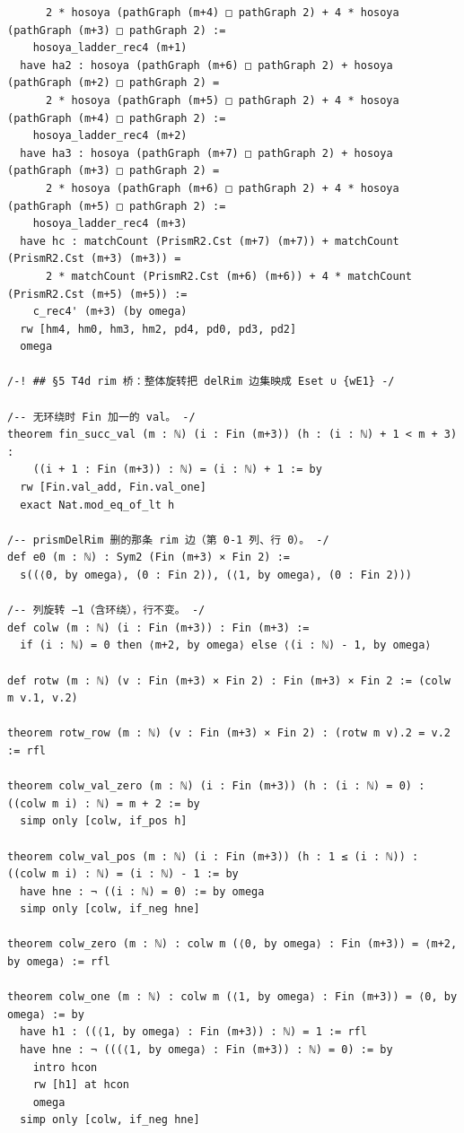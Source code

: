 \documentclass[11pt]{article}
\begin{document}
\begin{lstlisting}
      2 * hosoya (pathGraph (m+4) □ pathGraph 2) + 4 * hosoya (pathGraph (m+3) □ pathGraph 2) :=
    hosoya_ladder_rec4 (m+1)
  have ha2 : hosoya (pathGraph (m+6) □ pathGraph 2) + hosoya (pathGraph (m+2) □ pathGraph 2) =
      2 * hosoya (pathGraph (m+5) □ pathGraph 2) + 4 * hosoya (pathGraph (m+4) □ pathGraph 2) :=
    hosoya_ladder_rec4 (m+2)
  have ha3 : hosoya (pathGraph (m+7) □ pathGraph 2) + hosoya (pathGraph (m+3) □ pathGraph 2) =
      2 * hosoya (pathGraph (m+6) □ pathGraph 2) + 4 * hosoya (pathGraph (m+5) □ pathGraph 2) :=
    hosoya_ladder_rec4 (m+3)
  have hc : matchCount (PrismR2.Cst (m+7) (m+7)) + matchCount (PrismR2.Cst (m+3) (m+3)) =
      2 * matchCount (PrismR2.Cst (m+6) (m+6)) + 4 * matchCount (PrismR2.Cst (m+5) (m+5)) :=
    c_rec4' (m+3) (by omega)
  rw [hm4, hm0, hm3, hm2, pd4, pd0, pd3, pd2]
  omega

/-! ## §5 T4d rim 桥：整体旋转把 delRim 边集映成 Eset ∪ {wE1} -/

/-- 无环绕时 Fin 加一的 val。 -/
theorem fin_succ_val (m : ℕ) (i : Fin (m+3)) (h : (i : ℕ) + 1 < m + 3) :
    ((i + 1 : Fin (m+3)) : ℕ) = (i : ℕ) + 1 := by
  rw [Fin.val_add, Fin.val_one]
  exact Nat.mod_eq_of_lt h

/-- prismDelRim 删的那条 rim 边（第 0-1 列、行 0）。 -/
def e0 (m : ℕ) : Sym2 (Fin (m+3) × Fin 2) :=
  s((⟨0, by omega⟩, (0 : Fin 2)), (⟨1, by omega⟩, (0 : Fin 2)))

/-- 列旋转 −1（含环绕），行不变。 -/
def colw (m : ℕ) (i : Fin (m+3)) : Fin (m+3) :=
  if (i : ℕ) = 0 then ⟨m+2, by omega⟩ else ⟨(i : ℕ) - 1, by omega⟩

def rotw (m : ℕ) (v : Fin (m+3) × Fin 2) : Fin (m+3) × Fin 2 := (colw m v.1, v.2)

theorem rotw_row (m : ℕ) (v : Fin (m+3) × Fin 2) : (rotw m v).2 = v.2 := rfl

theorem colw_val_zero (m : ℕ) (i : Fin (m+3)) (h : (i : ℕ) = 0) : ((colw m i) : ℕ) = m + 2 := by
  simp only [colw, if_pos h]

theorem colw_val_pos (m : ℕ) (i : Fin (m+3)) (h : 1 ≤ (i : ℕ)) : ((colw m i) : ℕ) = (i : ℕ) - 1 := by
  have hne : ¬ ((i : ℕ) = 0) := by omega
  simp only [colw, if_neg hne]

theorem colw_zero (m : ℕ) : colw m (⟨0, by omega⟩ : Fin (m+3)) = ⟨m+2, by omega⟩ := rfl

theorem colw_one (m : ℕ) : colw m (⟨1, by omega⟩ : Fin (m+3)) = ⟨0, by omega⟩ := by
  have h1 : ((⟨1, by omega⟩ : Fin (m+3)) : ℕ) = 1 := rfl
  have hne : ¬ (((⟨1, by omega⟩ : Fin (m+3)) : ℕ) = 0) := by
    intro hcon
    rw [h1] at hcon
    omega
  simp only [colw, if_neg hne]


\end{lstlisting}
\end{document}
